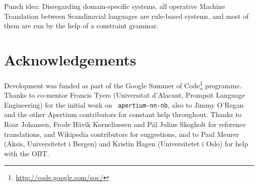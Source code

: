 \documentclass[11pt]{article}
\newcommand{\comment}[1]{\textbf{SKRIV} {\it #1}}
\renewcommand{\comment}[1]{}
\begin{document}
\comment{den der mangla litt...punch. me treng ein slutt!}

Punch idea: Disregarding domain-specific systems, all operative Machine 
Translation between Scandinavial languages are rule-based systems, and 
most of them are run by the help of a constraint grammar.


\section*{Acknowledgements}

Development was funded as part of the Google Summer of
Code\footnote{\href{http://code.google.com/soc/}{http://code.google.com/soc/}
} programme. Thanks to co-mentor Francis Tyers (Universitat d'Alacant,
Prompsit Language Engineering) for the initial work on {\tt
  apertium-nn-nb}, also to Jimmy O'Regan and the other Apertium
contributors for constant help throughout. Thanks to Roar Johansen,
Frode Håvik Korneliussen and Pål Julius Skogholt for reference
translations, and Wikipedia contributors for suggestions, and to Paul
Meurer (Aksis, Universitetet i Bergen) and Kristin Hagen
(Universitetet i Oslo) for help with the OBT.




\end{document}
